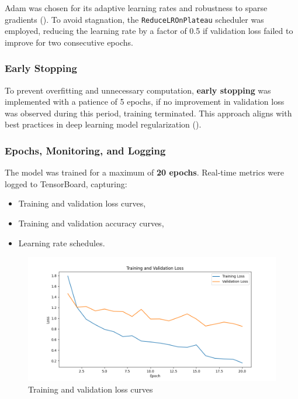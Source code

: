 \documentclass[
  12pt,
  oneside]{article}
\providecommand{\tightlist}{%
  \setlength{\itemsep}{0pt}\setlength{\parskip}{0pt}}
\begin{document}
Adam was chosen for its adaptive learning rates and robustness to sparse
gradients (). To avoid
stagnation, the \texttt{ReduceLROnPlateau} scheduler was employed,
reducing the learning rate by a factor of 0.5 if validation loss failed
to improve for two consecutive epochs.

\subsubsection{Early Stopping}\label{early-stopping}

To prevent overfitting and unnecessary computation, \textbf{early
stopping} was implemented with a patience of 5 epochs, if no improvement
in validation loss was observed during this period, training terminated.
This approach aligns with best practices in deep learning model
regularization ().

\subsubsection{Epochs, Monitoring, and
Logging}\label{epochs-monitoring-and-logging}

The model was trained for a maximum of \textbf{20 epochs}. Real-time
metrics were logged to TensorBoard, capturing:

\begin{itemize}
\tightlist
\item
  Training and validation loss curves,
\item
  Training and validation accuracy curves,
\item
  Learning rate schedules.
\end{itemize}

\begin{figure}

{\centering \includegraphics[width=0.9\linewidth]{loss_curve_v3} 

}

\caption{Training and validation loss curves}\label{fig:unnamed-chunk-5}
\end{figure}
\end{document}
